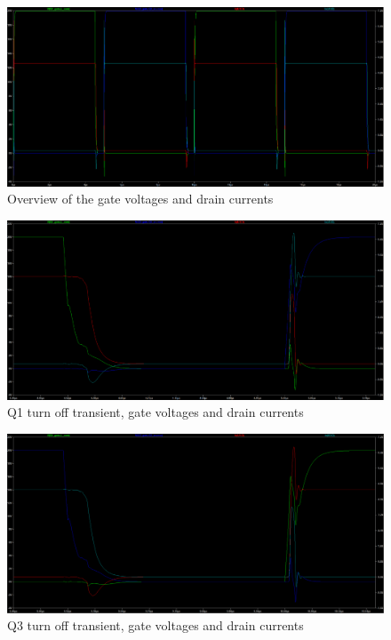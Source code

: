 \begin{figure}[H]
	\centering
	\includegraphics[width=\textwidth]{pictures/implementation/ind/ind_gates_1.PNG}
	\caption{Overview of the gate voltages and drain currents}
	\label{fig:ind_gates_1}
\end{figure}

\begin{figure}[H]
	\centering
	\includegraphics[width=\textwidth]{pictures/implementation/ind/ind_gates_2.PNG}
	\caption{Q1 turn off transient, gate voltages and drain currents}
	\label{fig:ind_gates_2}
\end{figure}

\begin{figure}[H]
	\centering
	\includegraphics[width=\textwidth]{pictures/implementation/ind/ind_gates_3.PNG}
	\caption{Q3 turn off transient, gate voltages and drain currents}
	\label{fig:ind_gates_3}
\end{figure}

